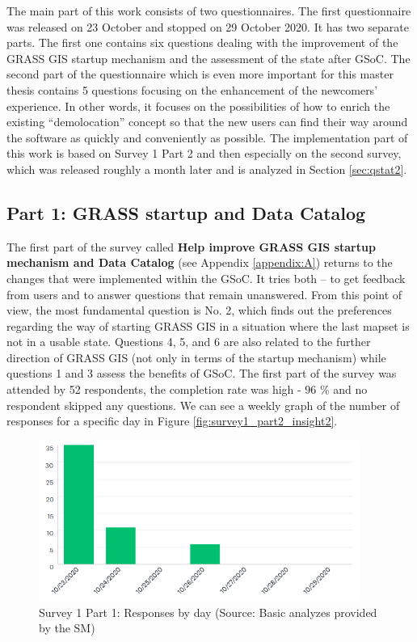 \documentclass[a4paper,10pt,twoside]{article}
\begin{document}
\noindent The main part of this work consists of two
questionnaires. The first questionnaire was released on 23 October and
stopped on 29 October 2020. It has two separate parts. The first one
contains six questions dealing with the improvement of the GRASS GIS
startup mechanism and the assessment of the state after GSoC. The
second part of the questionnaire which is even more important for this master
thesis contains 5 questions focusing on the enhancement of the
newcomers' experience. In other words, it focuses on the possibilities of
how to enrich the existing ``demolocation'' concept so that the new
users can find their way around the software as quickly and
conveniently as possible. The implementation part of this work is
based on Survey 1 Part 2 and then especially on
the second survey, which was released roughly a month later and is
analyzed in Section \ref{sec:qstat2}.

\subsection{Part 1: GRASS startup and Data Catalog}

\noindent The first part of the survey called \textbf {Help improve
  GRASS GIS startup mechanism and Data Catalog} 
  (see Appendix \ref{appendix:A}) returns to the changes
that were implemented within the GSoC. It tries both -- to get feedback
from users and to answer questions that remain unanswered. 
From this point of view, the most fundamental question is No. 2,
which finds out the preferences regarding the way of starting GRASS
GIS in a situation where the last mapset is not in a usable
state. Questions 4, 5, and 6 are also related to the further direction
of GRASS GIS (not only in terms of the startup mechanism) while
questions 1 and 3 assess the benefits of GSoC. The first part of the
survey was attended by 52 respondents, the completion rate was high -
96 \% and no respondent skipped any questions. We can see a weekly
graph of the number of responses for a specific day in Figure
\ref{fig:survey1_part2_insight2}.

\begin{figure}[hbt!] 
\begin{center}
\includegraphics[width=10.5cm]{../surveys/analyzed_data/survey1_part1_insight2.png} 
\caption[Survey 1 Part 1: Responses by day]{Survey 1 Part 1: Responses by day (Source: Basic analyzes provided by the SM)}
\label{fig:survey1_part1_insight2}
\end{center}
\end{figure}
\end{document}
